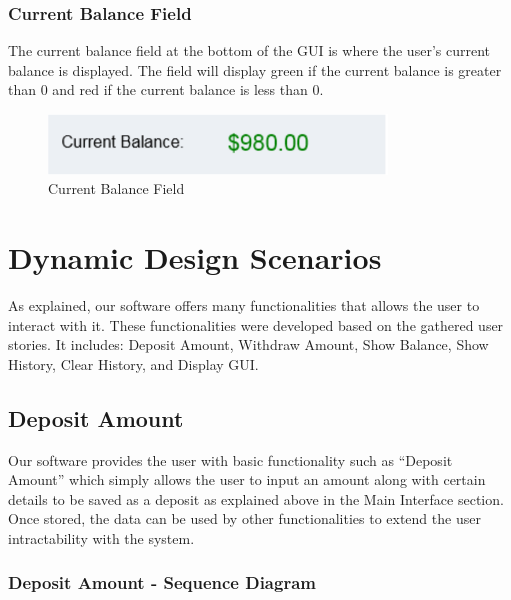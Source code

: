 \documentclass[12pt]{article}
\begin{document}
\subsubsection{Current Balance Field}
The current balance field at the bottom of the GUI is where the user’s current balance is displayed. The field will display green if the current balance is greater than 0 and red if the current balance is less than 0.

\begin{figure}[h!]
  \centering
  \includegraphics[width=90mm]{currentbalance.PNG}
  \caption{Current Balance Field}
\end{figure}


\section{Dynamic Design Scenarios}
As explained, our software offers many functionalities that allows the user to interact with it. These functionalities were developed based on the gathered user stories. It includes: Deposit Amount, Withdraw Amount, Show Balance, Show History, Clear History, and Display GUI. 

\subsection{Deposit Amount}

Our software provides the user with basic functionality such as “Deposit Amount” which simply allows the user to input an amount along with certain details to be saved as a deposit as explained above in the Main Interface section. Once stored, the data can be used by other functionalities to extend the user intractability with the system. 


\subsubsection{Deposit Amount - Sequence Diagram}
\end{document}
